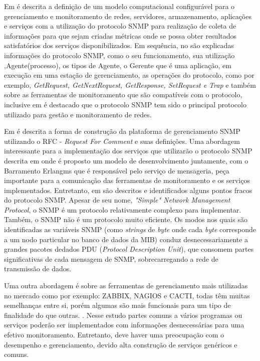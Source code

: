 \documentclass[qualidr]{eesc}
\begin{document}
Em \cite{deGeus} é descrita a definição de um modelo computacional configurável para o gerenciamento e monitoramento de redes, servidores, armazenamento, aplicações e serviços com a utilização do protocolo SNMP para realização de coleta de informações para que sejam criadas métricas onde se possa obter resultados satisfatórios dos serviços disponibilizados. Em sequência, no \cite{daSilva} são explicadas informações do protocolo SNMP, como o seu funcionamento, sua utilização ,Agente(processo), os tipos de Agente, o Gerente que é uma aplicação, em execução em uma estação de gerenciamento, as operações do protocolo, como por exemplo, \textit{GetRequest, 	GetNextRequest,  GetResponse,  SetRequest  e Trap} e também sobre as ferramentas de monitoramento que são compatíveis com o protocolo, inclusive em \cite{Fraga} é destacado que o protocolo SNMP tem sido o principal protocolo utilizado para gestão e monitoramento de redes. 

Em \cite{Dias} é descrita a forma de construção da plataforma de gerenciamento SNMP  utilizando  o RFC - \textit{Request For Comment} e suas definições. Uma abordagem interessante para a implementação dos serviços que utilizarão o protocolo SNMP  descrita em  \cite{Agilar} onde é proposto um modelo de desenvolvimento juntamente, com o Barramento Erlangms que é responsável pelo serviço de mensageria, peça importante para a comunicação das ferramentas de monitoramento e os serviços implementados. Entretanto, em \cite{deMello} são descritos e identificados alguns pontos fracos do protocolo SNMP. Apesar  de  seu  nome,  \textit{"Simple"  Network  Management  Protocol},  o  SNMP  é  um protocolo  relativamente  complexo  para  implementar.  Também,  o  SNMP  não  é  um protocolo muito eficiente. Os modos nos quais são identificadas as variáveis SNMP (como \textit{strings} de  \textit{byte} onde  cada  \textit{byte} corresponde  a  um  nodo  particular  no  banco  de  dados da MIB) conduz desnecessariamente a grandes pacotes dedados PDU (\textit{Protocol Description Unit}), que consomem partes significativas de cada mensagem de SNMP, sobrecarregando a rede de transmissão de dados.  

Uma outra abordagem é sobre as ferramentas de gerenciamento mais utilizadas no mercado como por exemplo: ZABBIX, NAGIOS e CACTI, todas têm muitas semelhanças entre si, porém algumas são mais funcionais para um tipo de finalidade do que outras. \cite{Braga}. Nesse estudo partes comuns a vários programas ou serviços poderão ser implementados com informações desnecessárias para uma efetivo monitoramento. Entretanto, deve haver uma preocupação com o desempenho e gerenciamento, devido alta construção de serviços genéricos e comuns.
\end{document}
